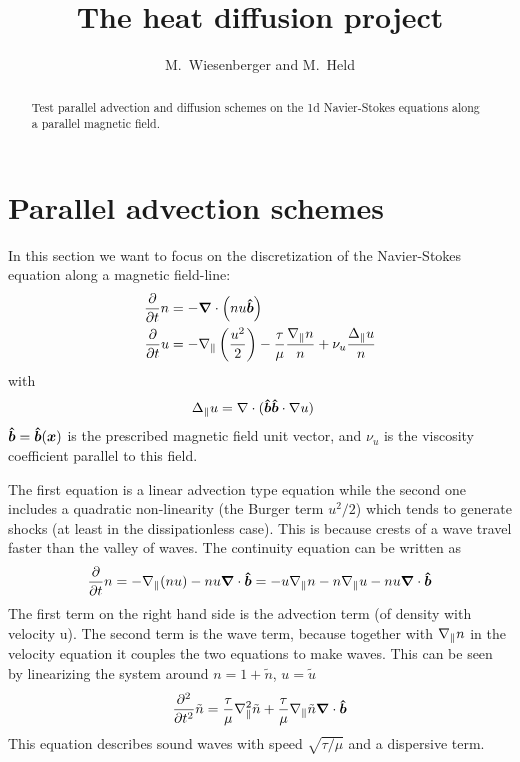 





\title{The heat diffusion project}
\author{ M.~Wiesenberger and M.~Held}
\maketitle

\begin{abstract}
    Test parallel advection and diffusion schemes on the 1d Navier-Stokes equations
    along a parallel magnetic field.
\end{abstract}
\tableofcontents

\section{Parallel advection schemes}
In this section we want to focus on the discretization of the Navier-Stokes equation
along a magnetic field-line:
\begin{align}
    \frac{\partial}{\partial t} n &= - {\boldsymbol{\nabla}}\cdot\left( nu\bm{\hat{b}}\right) \\
    \frac{\partial}{\partial t} u &= - \nabla_\parallel\left(\frac{u^2}{2}\right) - \frac{\tau}{\mu} \frac{\nabla_\parallel n}{n} + \nu_u \frac{\Delta_\parallel u}{n}
\end{align}
with
\begin{align}
\Delta_\parallel u &= \nabla\cdot ( \bm{\hat{b}}\bm{\hat{b}}\cdot\nabla u)
\end{align}
$\bm{\hat{b}} = \bm{\hat{b}}({\boldsymbol{x}})$ is the prescribed magnetic field unit vector,
and $\nu_u$ is the viscosity coefficient parallel to this field.

The first equation is a linear advection type equation while the second one includes
a quadratic non-linearity (the Burger term $u^2/2$) which tends to generate
shocks (at least in the dissipationless case). This is because crests of a wave
travel faster than the valley of waves.
The continuity equation can be written as
\begin{align}
    \frac{\partial}{\partial t} n = - \nabla_\parallel (nu) - nu {\boldsymbol{\nabla}}\cdot\bm{\hat{b}} = -u\nabla_\parallel n - n \nabla_\parallel u - nu{\boldsymbol{\nabla}}\cdot \bm{\hat{b}}
\end{align}
The first term on the right hand side is the advection term (of density with velocity u). The second term is the wave term, because together with $\nabla_\parallel n$ in the velocity
equation it couples the two equations to make waves. This can be seen by linearizing
the system around $n= 1 + \tilde n$, $u = \tilde u$
\begin{align}
    \frac{\partial^2}{\partial t^2} \tilde n = \frac{\tau}{\mu} \nabla_\parallel^2 \tilde n + \frac{\tau}{\mu} \nabla_\parallel \tilde n {\boldsymbol{\nabla}}\cdot\bm{\hat{b}}
\end{align}
This equation describes sound waves with speed $\sqrt{\tau/\mu}$ and a
dispersive term.

